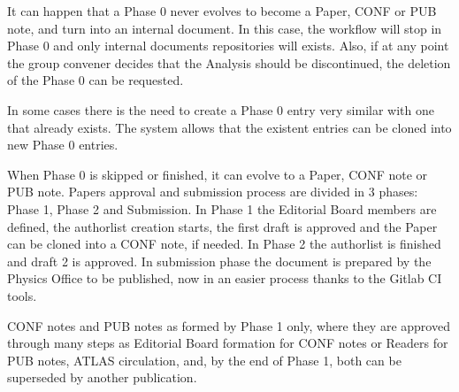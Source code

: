 It can happen that a Phase 0 never evolves to become a Paper, CONF or PUB note, and turn into an internal document. In this case, the workflow will stop in Phase 0 and only internal documents repositories will exists. Also, if at any point the group convener decides that the Analysis should be discontinued, the deletion of the Phase 0 can be requested.

In some cases there is the need to create a Phase 0 entry very similar with one that already exists. The system allows that the existent entries can be cloned into new Phase 0 entries.

When Phase 0 is skipped or finished, it can evolve to a Paper, CONF note or PUB note. Papers approval and submission process are divided in 3 phases: Phase 1, Phase 2 and Submission. In Phase 1 the Editorial Board members are defined, the authorlist creation starts, the first draft is approved and the Paper can be cloned into a CONF note, if needed. In Phase 2 the authorlist is finished and draft 2 is approved. In submission phase the document is prepared by the Physics Office to be published, now in an easier process thanks to the Gitlab CI tools.

CONF notes and PUB notes as formed by Phase 1 only, where they are approved through many steps as Editorial Board formation for CONF notes or Readers for PUB notes, ATLAS circulation, and, by the end of Phase 1, both can be superseded by another publication.